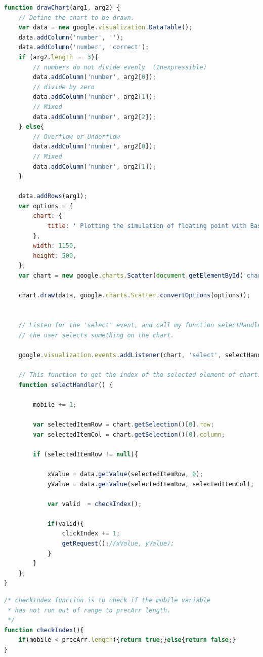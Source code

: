 \documentclass[11pt]{article}
\begin{document}

\begin{lstlisting}[label={lst:drawChart}, language=Javascript, caption={drawChart function will visualize the passed data to user.},]
function drawChart(arg1, arg2) {
	// Define the chart to be drawn. 
	var data = new google.visualization.DataTable();
	data.addColumn('number', '');
	data.addColumn('number', 'correct');
	if (arg2.length == 3){
		// numbers do not divide evenly  (Inexpressible) 
		data.addColumn('number', arg2[0]);
		// divide by zero
		data.addColumn('number', arg2[1]);
		// Mixed
		data.addColumn('number', arg2[2]);
	} else{
		// Overflow or Underflow
		data.addColumn('number', arg2[0]);
		// Mixed
		data.addColumn('number', arg2[1]);
	}
   
   	data.addRows(arg1);
    var options = {
    	chart: {
    		title: ' Plotting the simulation of floating point with Basic Arithmetics'
     	},
     	width: 1150,
     	height: 500,
    };
    var chart = new google.charts.Scatter(document.getElementById('chart_div1'));

    chart.draw(data, google.charts.Scatter.convertOptions(options));
 

	// Listen for the 'select' event, and call my function selectHandler() when
	// the user selects something on the chart.

    google.visualization.events.addListener(chart, 'select', selectHandler);

    // This function to get the index of the selected element of chart.
	function selectHandler() {

		mobile += 1;

		var selectedItemRow = chart.getSelection()[0].row;
		var selectedItemCol = chart.getSelection()[0].column;

		if (selectedItemRow != null){

			xValue = data.getValue(selectedItemRow, 0);
			yValue = data.getValue(selectedItemRow, selectedItemCol);

			var valid  = checkIndex();

			if(valid){
				clickIndex += 1;
				getRequest();//xValue, yValue);
			}
		}
	};
}
\end{lstlisting}

\begin{lstlisting}[label={lst:checkIndex}, language=Javascript, caption={check if the mobile variable has not run out of range to precArr length.},]
/* checkIndex function is to check if the mobile variable 
 * has not run out of range to precArr length. 
 */
function checkIndex(){
	if(mobile < precArr.length){return true;}else{return false;}
}
\end{lstlisting}
\end{document}
